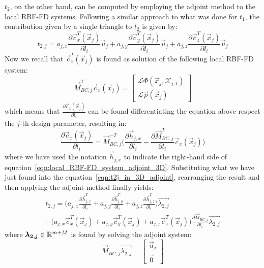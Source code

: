 $t_2$, on the other hand, can be computed by employing the adjoint method to the local RBF-FD systems. Following a similar approach to what was done for $t_1$, the contribution given by a single triangle to $t_2$ is given by:
\begin{equation}
	\label{eqn:t2j_in_3D_adjoint}
	t_{2,j} = a_{j,x}\frac{\partial \vec{c}_x^T(\vec{x}_j)}{\partial l_i}\vec{u}_j + a_{j,y}\frac{\partial \vec{c}_y^T(\vec{x}_j)}{\partial l_i}\vec{u}_j + a_{j,z}\frac{\partial \vec{c}_z^T(\vec{x}_j)}{\partial l_i}\vec{u}_j
\end{equation}
Now we recall that $\vec{c}_x^T(\vec{x}_j)$ is found as solution of the following local RBF-FD system:
\begin{equation}
	\label{eqn:local_RBF-FD_system_adjoint_3D}
	\vec{M}_{BC,j}^T \vec{c}_x(\vec{x}_j) =
	\begin{bmatrix}
		\mathcal{L} \Phi(\vec{x}_j, \mathcal{X}_{j,I})  \\
		\mathcal{L} \vec{p}(\vec{x}_j)
	\end{bmatrix}
\end{equation}
which means that $\frac{\partial \vec{c}_x(\vec{x}_j)}{\partial l_i}$ can be found differentiating the equation above respect the $j$-th design parameter, resulting in:
\begin{equation}
	\label{eqn:local_RBF-FD_system_differentited}
	\frac{\partial \vec{c}_x(\vec{x}_j)}{\partial l_i} = \vec{M}_{BC,j}^{-T} \biggl( \frac{\partial \vec{h}_{j,x}}{\partial l_i} - \frac{\partial \vec{M}_{BC,j}^T}{\partial l_i}\vec{c}_x(\vec{x}_j) \biggr)
\end{equation}
where we have used the notation $\vec{h}_{j,x}$ to indicate the right-hand side of equation~\eqref{eqn:local_RBF-FD_system_adjoint_3D}.
Substituting what we have just found into the equation~\eqref{eqn:t2j_in_3D_adjoint}, rearranging the result and then applying the adjoint method finally yields:
\begin{multline}
	t_{2,j} = \biggl( a_{j,x} \frac{\partial \vec{h}_{j,x}^T}{\partial l_i} + a_{j,y} \frac{\partial \vec{h}_{j,y}^T}{\partial l_i} + a_{j,z} \frac{\partial \vec{h}_{j,z}^T}{\partial l_i} \biggr) \vec{\lambda_{2,j}}  \\
	 - \biggl( a_{j,x}\vec{c}_x^T(\vec{x}_j) + a_{j,y}\vec{c}_y^T(\vec{x}_j) + a_{j,z}\vec{c}_z^T(\vec{x}_j) \biggr) \frac{\partial \vec{M}_{BC,j}}{\partial l_i} \vec{\lambda_{2,j}}
\end{multline}
where $\boldsymbol{\lambda_{2,j}} \in \mathbb{R}^{m+M}$ is found by solving the adjoint system:
\begin{equation}
	\label{eqn:adjoint_system_t2j}
	\vec{M}_{BC,j} \vec{\lambda_{2,j}} =
	\begin{bmatrix}
		\vec{u}_j  \\
		\vec{0}
	\end{bmatrix}
\end{equation}

